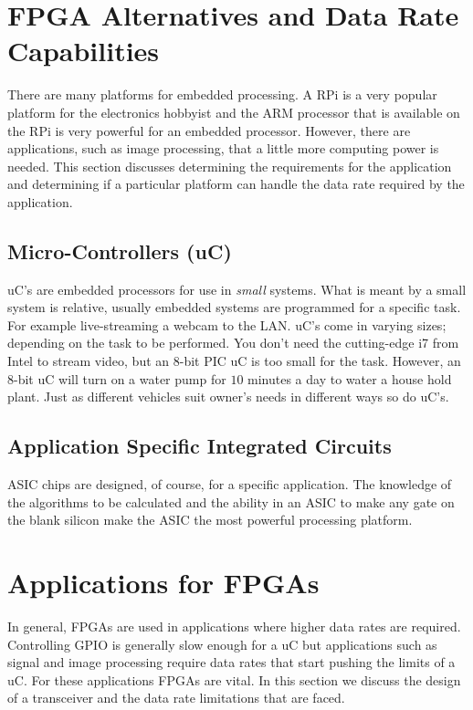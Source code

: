 \section{FPGA Alternatives and Data Rate Capabilities}

There are many platforms for embedded processing. A \ac{RPi} is a very popular platform for the electronics hobbyist and the \ac{ARM} processor that is available on the \ac{RPi} is very powerful for an embedded processor. However, there are applications, such as image processing, that a little more computing power is needed. This section discusses determining the requirements for the application and determining if a particular platform can handle the data rate required by the application. 

\subsection{Micro-Controllers (uC)}

\ac{uC}'s are embedded processors for use in \emph{small} systems. What is meant by a small system is relative, usually embedded systems are programmed for a specific task. For example live-streaming a webcam to the \ac{LAN}. \ac{uC}'s come in varying sizes; depending on the task to be performed. You don't need the cutting-edge i7 from Intel to stream video, but an 8-bit \ac{PIC} \ac{uC} is too small for the task. However, an 8-bit \ac{uC} will turn on a water pump for $10$ minutes a day to water a house hold plant. Just as different vehicles suit owner's needs in different ways so do \ac{uC}'s.

\subsection{Application Specific Integrated Circuits}

\ac{ASIC} chips are designed, of course, for a specific application. The knowledge of the algorithms to be calculated and the ability in an \ac{ASIC} to make any gate on the blank silicon make the \ac{ASIC} the most powerful processing platform. 

\section{Applications for FPGAs}

In general, \ac{FPGA}s are used in applications where higher data rates are required. Controlling \ac{GPIO} is generally slow enough for a \ac{uC} but applications such as signal and image processing require data rates that start pushing the limits of a \ac{uC}. For these applications \ac{FPGA}s are vital. In this section we discuss the design of a transceiver and the data rate limitations that are faced. 

